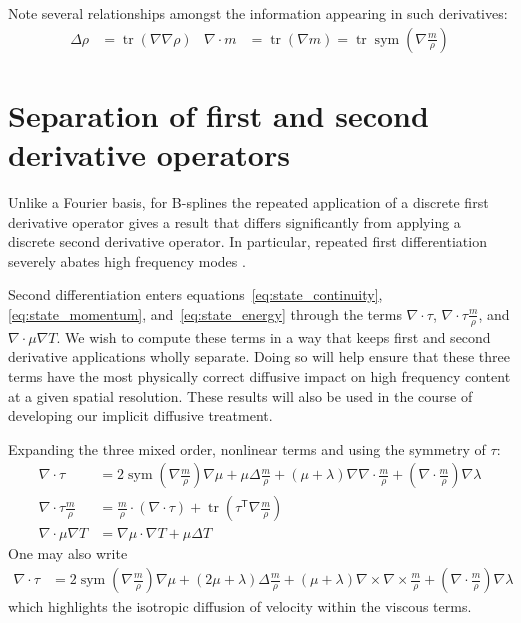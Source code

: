 \documentclass[letterpaper,11pt,nointlimits,reqno,draft]{amsbook}
\newcommand{\trans}[1]{{#1}^{\ensuremath{\mathsf{T}}}}
\newcommand{\symmetricpart}[1]
  {\ensuremath{\operatorname{sym}\left(#1\right)}}
\DeclareMathOperator{\trace}{tr}
\begin{document}
Note several relationships amongst the information appearing in such
derivatives:
\begin{align}\label{eq:relationships}
  \Delta\rho
  &=
  \trace\left( \nabla\nabla\rho \right)
&
  \nabla\cdot{}m
  &=
  \trace\left(\nabla{}m\right)
  =
  \trace\symmetricpart{\nabla\frac{m}{\rho}}
\end{align}

\section{Separation of first and second derivative operators}
\label{sec:separate_first_second_deriv}

Unlike a Fourier basis, for B-splines the repeated application of a discrete
first derivative operator gives a result that differs significantly from
applying a discrete second derivative operator.  In particular, repeated first
differentiation severely abates high frequency modes
\citep[see][figures~2--3]{Kwok2001}.

Second differentiation enters equations~\eqref{eq:state_continuity},
\eqref{eq:state_momentum}, and~\eqref{eq:state_energy} through the terms
$\nabla\cdot\tau$, $\nabla\cdot\tau\frac{m}{\rho}$, and
$\nabla\cdot\mu\nabla{}T$.  We wish to compute these terms in a way that keeps
first and second derivative applications wholly separate.  Doing so will help
ensure that these three terms have the most physically correct diffusive impact
on high frequency content at a given spatial resolution.  These results will
also be used in the course of developing our implicit diffusive treatment.

Expanding the three mixed order, nonlinear terms and using the symmetry of
$\tau$:
\begin{align}
\label{eq:nabla_cdot_tau_expansion}
  \nabla\cdot\tau
  &=
    2 \symmetricpart{\nabla\frac{m}{\rho}}\nabla\mu
  + \mu \Delta\frac{m}{\rho}
  + \left(\mu+\lambda\right)\nabla\nabla\cdot\frac{m}{\rho}
  + \left(\nabla\cdot\frac{m}{\rho}\right)\nabla\lambda
\\
\label{eq:nabla_cdot_tau_u_expansion}
  \nabla\cdot\tau{}\frac{m}{\rho}
  &=
    \frac{m}{\rho}\cdot\left(\nabla\cdot\tau\right)
  + \trace\left( \trans{\tau}\nabla\frac{m}{\rho} \right)
\\
  \nabla\cdot\mu\nabla{}T \label{eq:mu_delta_T}
  &=
    \nabla\mu\cdot\nabla{}T
  + \mu \Delta{}T
\end{align}
One may also write
\begin{align}\label{eq:nabla_cdot_tau_expansion_alt}
  \nabla\cdot\tau
  &=
    2 \symmetricpart{\nabla\frac{m}{\rho}}\nabla\mu
  + \left(2\mu+\lambda\right) \Delta\frac{m}{\rho}
  + \left(\mu+\lambda\right)\nabla\times\nabla\times\frac{m}{\rho}
  + \left(\nabla\cdot\frac{m}{\rho}\right)\nabla\lambda
\end{align}
which highlights the isotropic diffusion of velocity within the viscous terms.
\end{document}
